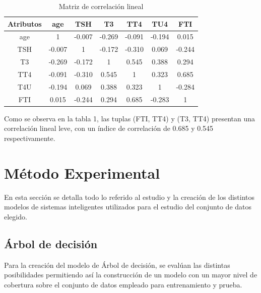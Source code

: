 \documentclass[osajnl,twocolumn,showpacs,superscriptaddress,10pt,floatfix]{revtex4-1} %
\begin{document}
\begin{table}[h!]
    \centering
    \begin{tabular}{ccccccc}

        Atributos & age & TSH & T3 & TT4 & TU4 & FTI \\
        \hline
        age & 1 & -0.007 & -0.269 & -0.091 & -0.194 & 0.015 \\

        TSH & -0.007 & 1 & -0.172 & -0.310 & 0.069 & -0.244 \\
        
        T3 & -0.269 & -0.172 & 1 & 0.545 & 0.388 & 0.294 \\
        
        TT4 & -0.091 & -0.310 & 0.545 & 1 & 0.323 & 0.685 \\
        
        T4U & -0.194 & 0.069 & 0.388 & 0.323 & 1 & -0.284 \\
        
        FTI & 0.015 & -0.244 & 0.294 & 0.685 & -0.283 & 1 \\
        \hline
    \end{tabular}
    \caption{Matriz de correlación lineal}
    \label{table:correlation_matrix}
\end{table}

Como se observa en la tabla 1, las tuplas (FTI, TT4) y (T3, TT4) presentan una correlación lineal leve, con un índice de correlación de 0.685 y 0.545 respectivamente. \\

\section{Método Experimental}

En esta sección se detalla todo lo referido al estudio y la creación de los distintos modelos de sistemas inteligentes utilizados para el estudio del conjunto de datos elegido. \\

\subsection{Árbol de decisión}

Para la creación del modelo de Árbol de decisión, se evalúan las distintas posibilidades permitiendo así la construcción de un modelo con un mayor nivel de cobertura sobre el conjunto de datos empleado para entrenamiento y prueba. \\
\end{document}
